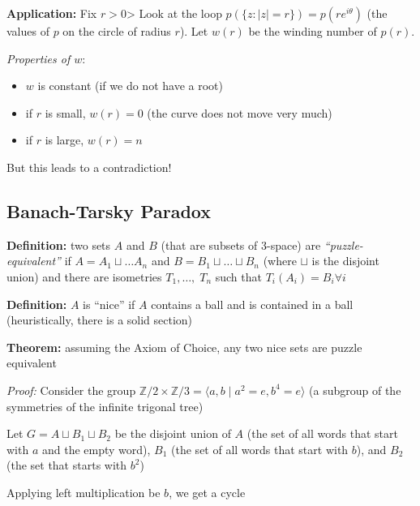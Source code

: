 \documentclass[12pt]{report}
\newcommand{\brak}[1]{\langle #1 \rangle}
\newcommand{\Z}{\mathbb{Z}}
\newcommand{\abs}[1]{\left\vert #1 \right\vert}
\begin{document}
        \textbf{Application:} Fix $r > 0$> Look at the loop $p(\{z : \abs{z} = r\}) = p(re^{i\theta})$ (the values of $p$ on the circle of radius $r$). Let $w(r)$ be the winding number of $p(r)$. 

        \emph{Properties of $w$}:
        \begin{itemize}
            \item $w$ is constant (if we do not have a root)
            \item if $r$ is small, $w(r) = 0$ (the curve does not move very much)
            \item if $r$ is large, $w(r) = n$ 
        \end{itemize}
        But this leads to a contradiction! 

    \subsection*{Banach-Tarsky Paradox}
        \textbf{Definition:} two sets $A$ and $B$ (that are subsets of 3-space) are \emph{``puzzle-equivalent''} if $A = A_1 \sqcup  \dots A_n$ and $B = B_1 \sqcup  \dots \sqcup  B_n$ (where $\sqcup$ is the disjoint union) and there are isometries $T_1, \dots, \; T_n$ such that $T_i(A_i) = B_i \forall i$ 

        \textbf{Definition:} $A$ is ``nice'' if $A$ contains a ball and is contained in a ball (heuristically, there is a solid section)

        \textbf{Theorem:} assuming the Axiom of Choice, any two nice sets are puzzle equivalent

        \emph{Proof:} Consider the group $\Z/2 \times \Z/3 = \brak{a, b \; | \; a^2 = e, b^4 = e}$ (a subgroup of the symmetries of the infinite trigonal tree)

        Let $G = A \sqcup B_1 \sqcup B_2$ be the disjoint union of $A$ (the set of all words that start with $a$ and the empty word), $B_1$ (the set of all words that start with $b$), and $B_2$ (the set that starts with $b^2$)
     
        Applying left multiplication be $b$, we get a cycle 
        \begin{center}
        \end{center}
\end{document}
